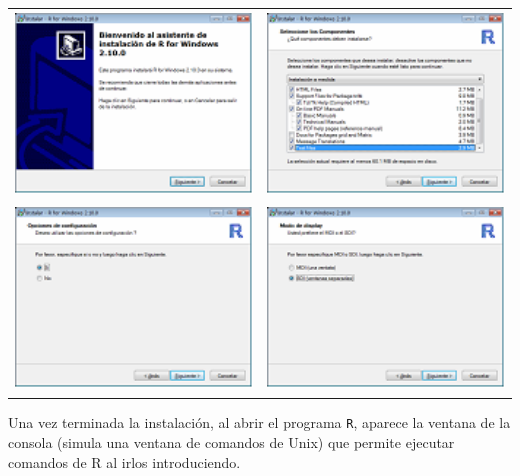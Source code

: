 \documentclass[]{book}
\begin{document}
\begin{longtable}[]{@{}cc@{}}
\toprule
\includegraphics[width=2.53750in,height=1.92500in]{figuras/image3.png} &
\includegraphics[width=2.53750in,height=1.92500in]{figuras/image4.png}\tabularnewline
\includegraphics[width=2.53750in,height=1.92500in]{figuras/image5.png} &
\includegraphics[width=2.53750in,height=1.92500in]{figuras/image6.png}\tabularnewline
\bottomrule
\end{longtable}

Una vez terminada la instalación, al abrir el programa \texttt{R},
aparece la ventana de la consola (simula una ventana de comandos de
Unix) que permite ejecutar comandos de R al irlos introduciendo.
\end{document}
